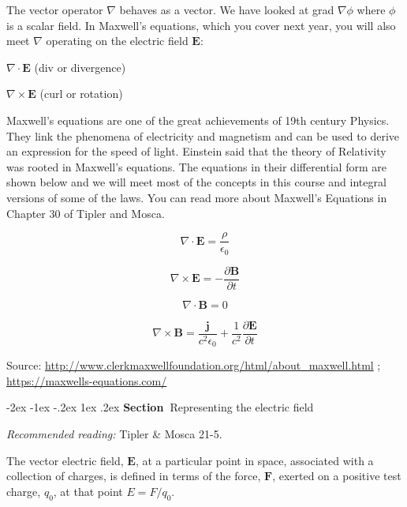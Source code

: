 \documentclass[
]{book}
\makeatletter
\renewcommand\section{%
\@startsection{section}{1}{\z@}%
              {-2ex \@plus -1ex \@minus -.2ex}%
              {1ex \@plus .2ex}%
              {\sffamily\bfseries\large\noindent Section~}}
\makeatother
\begin{document}
The vector operator \(\nabla\) behaves as a vector. We have looked at grad
\(\nabla\phi\) where \(\phi\) is a scalar field. In Maxwell's equations,
which you cover next year, you will also meet \(\nabla\) operating on the
electric field \(\mathbf{E}\):

\(\nabla \cdot \mathbf{E}\) (div or divergence)

\(\nabla \times \mathbf{E}\) (curl or rotation)

Maxwell's equations are one of the great achievements of 19th century
Physics. They link the phenomena of electricity and magnetism and can be
used to derive an expression for the speed of light. Einstein said that
the theory of Relativity was rooted in Maxwell's equations. The
equations in their differential form are shown below and we will meet
most of the concepts in this course and integral versions of some of the
laws. You can read more about Maxwell's Equations in Chapter 30 of
Tipler and Mosca.

\begin{equation}
\label{eq:maxwell1}
\nabla \cdot \mathbf{E} = \frac{\rho}{\epsilon_0}
\end{equation}

\begin{equation}
\label{eq:maxwell2}
\nabla \times \mathbf{E} = - \frac{\partial \mathbf{B}}{\partial t} 
\end{equation}

\begin{equation}
\label{eq:maxwell3}
\nabla \cdot \mathbf{B} = 0
\end{equation}

\begin{equation}
\label{eq:maxwell4}
\nabla \times \mathbf{B} = \frac{\mathbf{j}}{c^2 \epsilon_0} + \frac{1}{c^2} \frac{\partial \mathbf{E}}{\partial t}
\end{equation}

Source: \url{http://www.clerkmaxwellfoundation.org/html/about_maxwell.html}
; \url{https://maxwells-equations.com/}

\hypertarget{representing-the-electric-field}{%
\section{Representing the electric field}\label{representing-the-electric-field}}

\emph{Recommended reading:} Tipler \& Mosca 21-5.

The vector electric field, \(\mathbf{E}\), at a particular point in space,
associated with a collection of charges, is defined in terms of the
force, \(\mathbf{F}\), exerted on a positive test charge, \(q_0\), at that point
\(E = F/q_0\).
\end{document}
